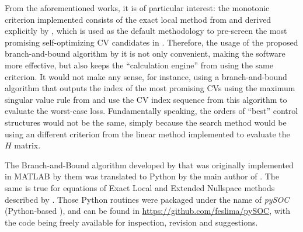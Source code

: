 \documentclass[../msc-thesis.tex]{subfiles}
\begin{document}
From the aforementioned works, \textcite{Kariwala2009} it is of particular 
interest: the monotonic criterion implemented consists of the exact local 
method from \textcite{Halvorsen2003} and derived explicitly by 
\textcite{Alstad2009}, which is used as the default methodology to pre-screen 
the most promising self-optimizing CV candidates in \mtc. Therefore, the usage 
of the proposed branch-and-bound algorithm by \textcite{Kariwala2009} it is 
not only convenient, making the software more effective, but also keeps the 
``calculation engine'' from \mtc using the same criterion. It would not make 
any sense, for instance, using a branch-and-bound algorithm that outputs the 
index of the most promising CVs using the maximum singular value rule from 
\textcite{SkogestadBook} and use the CV index sequence from this algorithm 
to evaluate the worst-case loss. Fundamentally speaking, the orders of 
``best'' control structures would not be the same, simply because the search 
method would be using an different criterion from the linear method 
implemented to evaluate the $H$ matrix.

The Branch-and-Bound algorithm developed by \textcite{Kariwala2009} that was 
originally implemented in MATLAB\textsuperscript{\textregistered} by them was 
translated to Python by the main author of \textcite{Alves2018}. The same is true 
for equations of Exact Local and Extended Nullspace methods described by 
\textcite{Alstad2009}. Those Python routines were packaged under the name 
of \textit{pySOC} (Python-based \soc), and can be found in 
\url{https://github.com/feslima/pySOC}, with the code being freely available 
for inspection, revision and suggestions.
\end{document}
